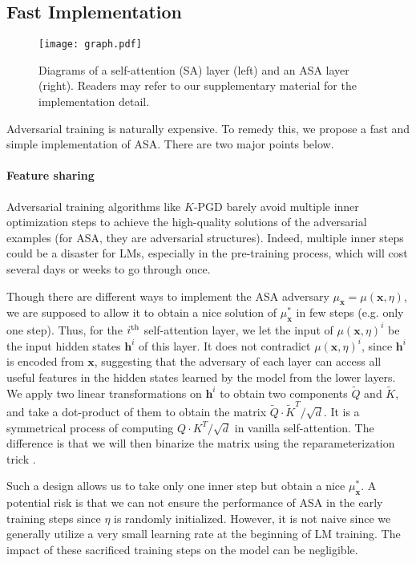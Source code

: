 \documentclass[letterpaper]{article} \usepackage{aaai23}  \usepackage{times}  \usepackage{helvet}  \usepackage{courier}  \usepackage[hyphens]{url}  \usepackage{graphicx} \urlstyle{rm} \def\UrlFont{\rm}  \usepackage{natbib}  \usepackage{caption} \frenchspacing  \setlength{\pdfpagewidth}{8.5in}  \setlength{\pdfpageheight}{11in}  \usepackage{algorithm}
\begin{document}
\subsection{Fast Implementation}
\label{fastasa}

\begin{figure}
\centering
\texttt{[image: graph.pdf]}
\caption{Diagrams of a self-attention (SA) layer (left) and an ASA layer (right). Readers may refer to our supplementary material for the implementation detail.}
\label{f2}
\end{figure}

Adversarial training is naturally expensive. To remedy this, we propose a fast and simple implementation of ASA. There are two major points below.

\paragraph{Feature sharing} Adversarial training algorithms like $K$-PGD \citep{DBLP:conf/iclr/MadryMSTV18} barely avoid multiple inner optimization steps to achieve the high-quality solutions of the adversarial examples (for ASA, they are adversarial structures). Indeed, multiple inner steps could be a disaster for LMs, especially in the pre-training process, which will cost several days or weeks to go through once.

Though there are different ways to implement the ASA adversary $ \mu_{\mathbf x}=\mu(\mathbf x,\eta) $, we are supposed to allow it to obtain a nice solution of $ \mu_{\mathbf x}^* $ in few steps (e.g. only one step). Thus, for the $ i^{\rm th} $ self-attention layer, we let the input of $ \mu(\mathbf x,\eta)^i $ be the input hidden states $ \mathbf h^i $ of this layer. It does not contradict $ \mu(\mathbf x,\eta)^i $, since $ \mathbf h^i $ is encoded from $ \mathbf x $, suggesting that the adversary of each layer can access all useful features in the hidden states learned by the model from the lower layers. We apply two linear transformations on $ \mathbf h^i $ to obtain two components $ \widetilde Q $ and $ \widetilde K $, and take a dot-product of them to obtain the matrix $ {\widetilde Q \cdot \widetilde K^{T}}/{\sqrt{d}} $. It is a symmetrical process of computing $ {Q \cdot K^{T}}/{\sqrt{d}} $ in vanilla self-attention. The difference is that we will then binarize the matrix using the reparameterization trick \citep{DBLP:conf/iclr/JangGP17}.

Such a design allows us to take only one inner step but obtain a nice $ \mu_{\mathbf x}^* $. A potential risk is that we can not ensure the performance of ASA in the early training steps since $ \eta $ is randomly initialized. However, it is not naive since we generally utilize a very small learning rate at the beginning of LM training. The impact of these sacrificed training steps on the model can be negligible.
\end{document}
